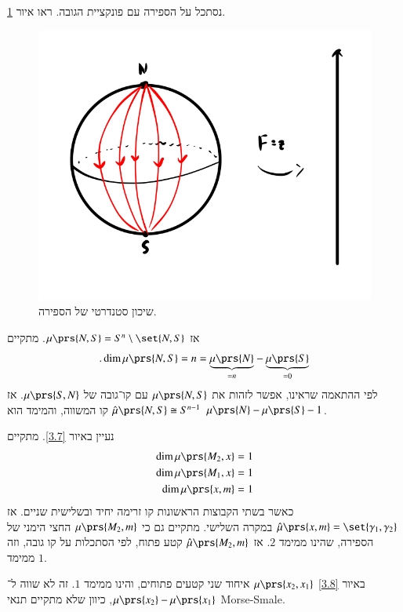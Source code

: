 \documentclass[a4paper,10pt,twoside,openany]{book}
\begin{document}
\begin{example}
נסתכל על הספירה עם פונקציית הגובה.
ראו איור
\ref{5.2}.

\begin{figure}
\centering
\includegraphics[scale=0.5]{sources/5.2}
\caption{שיכון סטנדרטי של הספירה.}
\label{5.2}
\end{figure}

אז
$\mu\prs{N,S} = S^n \setminus \set{N,S}$.
מתקיים
\[\text{.} \dim \mu\prs{N,S} = n = \underset{=n}{\underbrace{\mu\prs{N}}} - \underset{= 0}{\underbrace{\mu\prs{S}}}\]
לפי ההתאמה שראינו, אפשר לזהות את
$\mu\prs{N,S}$
עם קו־גובה של
$\mu\prs{S,N}$.
אז
$\hat{\mu}\prs{N,S} \cong S^{n-1}$
קו המשווה, והמימד הוא
$\mu\prs{N} - \mu\prs{S} - 1$.
\end{example}

\begin{example}
נעיין באיור
\ref{3.7}.
מתקיים
\begin{align*}
\dim \mu\prs{M_2, x} &= 1 \\
\dim \mu\prs{M_1, x} &= 1 \\
\dim \mu\prs{x, m} &= 1
\end{align*}
כאשר בשתי הקבוצות הראשונות קו זרימה יחיד ובשלישית שניים. אז
$\hat{\mu}\prs{x,m} = \set{\gamma_1, \gamma_2}$
במקרה השלישי.
מתקיים גם כי
$\mu\prs{M_2, m}$
החצי הימני של הספירה, שהינו ממימד
$2$.
אז
$\hat{\mu}\prs{M_2, m}$
קטע פתוח, לפי הסתכלות על קו גובה, וזה ממימד
$1$.
\end{example}

\begin{example}
באיור
\ref{3.8}
$\mu\prs{x_2, x_1}$
איחוד שני קטעים פתוחים, והינו ממימד
$1$.
זה לא שווה ל־%
$\mu\prs{x_2} - \mu\prs{x_1}$,
כיוון שלא מתקיים תנאי
\textenglish{Morse-Smale}.
\end{example}
\end{document}
